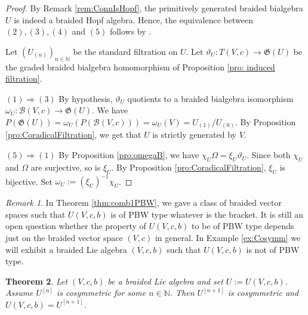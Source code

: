 \documentclass[english]{amsart}
\numberwithin{equation}{section}
\numberwithin{figure}{section}
\theoremstyle{plain}
\newtheorem{thm}{Theorem}[section]
\theoremstyle{definition}
\theoremstyle{definition}
\theoremstyle{remark}
\theoremstyle{remark}
\newtheorem{rem}[thm]{Remark}
\theoremstyle{plain}
\theoremstyle{plain}
\theoremstyle{plain}
\begin{document}
\begin{proof}
By Remark \ref{rem:ConnIsHopf}, the primitively generated braided
bialgebra $U$ is indeed a braided Hopf algebra. Hence, the equivalence
between $\left(2\right),\left(3\right),\left(4\right)$ and $\left(5\right)$
follows by \cite[Theorem 3.5]{Kharchenko- connected}. 

Let $\left(U_{\left(n\right)}\right)_{n\in\mathbb{N}}$ be the standard
filtration on $U$. Let $\vartheta_{U}:T\left(V,c\right)\rightarrow\mathfrak{G}\left(U\right)$
be the graded braided bialgebra homomorphism of Proposition \ref{pro: induced filtration}.

$\left(1\right)\Rightarrow\left(3\right)$ By hypothesis, $\vartheta_{U}$
quotients to a braided bialgebra isomorphism $\omega_{U}:\mathcal{B}\left(V,c\right)\rightarrow\mathfrak{G}\left(U\right)$.
We have $P\left(\mathfrak{G}\left(U\right)\right)=\omega_{U}\left(P\left(\mathcal{B}\left(V,c\right)\right)\right)=\omega_{U}\left(V\right)=U_{\left(1\right)}/U_{\left(0\right)}$.
By Proposition \ref{pro:CoradicalFiltration}, we get that $U$ is
strictly generated by $V$.

$\left(5\right)\Rightarrow\left(1\right)$ By Proposition \ref{pro:omegaB},
we have $\chi_{U}\Omega=\xi_{U}\vartheta_{U}$. Since both $\chi_{U}$
and $\Omega$ are surjective, so is $\xi_{U}$. By Proposition \ref{pro:CoradicalFiltration},
$\xi_{U}$ is bijective. Set $\omega_{U}:=\left(\xi_{U}\right)^{-1}\chi_{U}$.\end{proof}
\begin{rem}
In Theorem \ref{thm:comb1PBW}, we gave a class of braided vector
spaces such that $U\left(V,c,b\right)$ is of PBW type whatever is
the bracket. It is still an open question whether the property of
$U\left(V,c,b\right)$ to be of PBW type depends just on the braided
vector space $\left(V,c\right)$ in general. In Example \ref{ex:Cosymm}
we will exhibit a braided Lie algebra $\left(V,c,b\right)$ such that
$U\left(V,c,b\right)$ is not of PBW type.\end{rem}






\begin{thm}
\label{thm:KhaCosym}Let $\left(V,c,b\right)$ be a braided Lie algebra
and set $U:=U\left(V,c,b\right)$. Assume $U^{\left[n\right]}$ is
cosymmetric for some $n\in\mathbb{N}$. Then $U^{\left[n+1\right]}$
is cosymmetric and $U\left(V,c,b\right)=U^{\left[n+1\right]}$. \end{thm}
\end{document}
